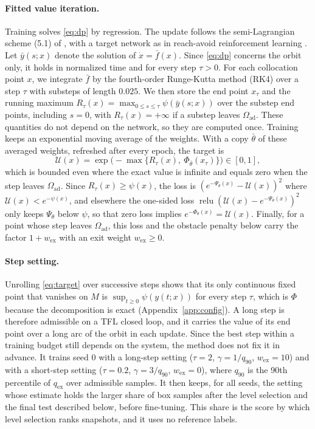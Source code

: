 \documentclass{l4dc2027}
\newcommand{\Oad}{\Omega_{\mathrm{ad}}}
\newcommand{\qex}{q_{\mathrm{ex}}}
\newcommand{\relu}{\operatorname{relu}}
\begin{document}
\paragraph{Fitted value iteration.} Training solves \eqref{eq:dp} by regression. The update follows the semi-Lagrangian scheme (5.1) of \citet{gruene2015}, with a target network as in reach-avoid reinforcement learning \citep{hsu2021}. Let $\bar y(s;x)$ denote the solution of $\dot x=\bar f(x)$. Since \eqref{eq:dp} concerns the orbit only, it holds in normalized time and for every step $\tau>0$. For each collocation point $x$, we integrate $\bar f$ by the fourth-order Runge-Kutta method (RK4) over a step $\tau$ with substeps of length $0.025$. We then store the end point $x_\tau$ and the running maximum $R_\tau(x)=\max_{0\le s\le\tau}\psi(\bar y(s;x))$ over the substep end points, including $s=0$, with $R_\tau(x)=+\infty$ if a substep leaves $\Oad$. These quantities do not depend on the network, so they are computed once. Training keeps an exponential moving average of the weights. With a copy $\bar\theta$ of these averaged weights, refreshed after every epoch, the target is
\begin{equation}\label{eq:target}
\mathcal U(x)=\exp\!\big(-\max\{R_\tau(x),\ \Phi_{\bar\theta}(x_\tau)\}\big)\in[0,1],
\end{equation}
which is bounded even where the exact value is infinite and equals zero when the step leaves $\Oad$. Since $R_\tau(x)\ge\psi(x)$, the loss is $(e^{-\Psi_\theta(x)}-\mathcal U(x))^2$ where $\mathcal U(x)<e^{-\psi(x)}$, and elsewhere the one-sided loss $\relu(\mathcal U(x)-e^{-\Psi_\theta(x)})^2$ only keeps $\Psi_\theta$ below $\psi$, so that zero loss implies $e^{-\Phi_\theta(x)}=\mathcal U(x)$. Finally, for a point whose step leaves $\Oad$, this loss and the obstacle penalty below carry the factor $1+w_{\mathrm{ex}}$ with an exit weight $w_{\mathrm{ex}}\ge0$.

\vspace{-0.075in}

\paragraph{Step setting.} Unrolling \eqref{eq:target} over successive steps shows that its only continuous fixed point that vanishes on $M$ is $\sup_{t\ge0}\psi(y(t;x))$ for every step $\tau$, which is $\Phi$ because the decomposition is exact (Appendix~\ref{app:config}). A long step is therefore admissible on a TFL closed loop, and it carries the value of its end point over a long arc of the orbit in each update. Since the best step within a training budget still depends on the system, the method does not fix it in advance. It trains seed 0 with a long-step setting ($\tau=2$, $\gamma=1/q_{90}$, $w_{\mathrm{ex}}=10$) and with a short-step setting ($\tau=0.2$, $\gamma=3/q_{90}$, $w_{\mathrm{ex}}=0$), where $q_{90}$ is the 90th percentile of $\qex$ over admissible samples. It then keeps, for all seeds, the setting whose estimate holds the larger share of box samples after the level selection and the final test described below, before fine-tuning. This share is the score by which level selection ranks snapshots, and it uses no reference labels.
\end{document}
